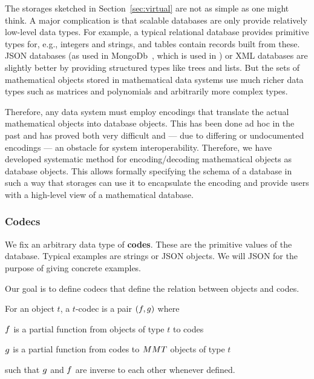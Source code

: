 The storages sketched in Section~\ref{sec:virtual} are not as simple as one might think.
A major complication is that scalable databases are only provide relatively low-level data
types.  For example, a typical relational database provides primitive types for, e.g.,
integers and strings, and tables contain records built from these.  JSON databases (as
used in MongoDb~\cite{Chodorow:mdg10}, which is used in \LMFDB) or XML databases are
slightly better by providing structured types like trees and lists.  But the sets of
mathematical objects stored in mathematical data systems use much richer data types such
as matrices and polynomials and arbitrarily more complex types.

Therefore, any data system must employ encodings that translate the actual mathematical objects into database objects.
This has been done ad hoc in the past and has proved both very difficult and --- due to differing or undocumented encodings --- an obstacle for system interoperability.
Therefore, we have developed systematic method for encoding/decoding mathematical objects as database objects.
This allows formally specifying the schema of a database in such a way that \MMT storages can use it to encapsulate the encoding and provide users with a high-level view of a mathematical database.


\subsubsection{Codecs}

We fix an arbitrary data type of \textbf{codes}.
These are the primitive values of the database.
Typical examples are strings or JSON objects.
We will JSON for the purpose of giving concrete examples.

Our goal is to define codecs that define the relation between \MMT objects and codes.

\begin{mydef}[Codec]
  For an \MMT object $t$, a $t$-codec is a pair $(\enc, \dec)$ where
  \begin{compactitem}
   \item $\enc$ is a partial function from \MMT objects of type $t$ to codes
   \item $\dec$ is a partial function from codes to $\MMT$ objects of type $t$
  \end{compactitem}
  such that $\dec$ and $\enc$ are inverse to each other whenever defined.
\end{mydef}

